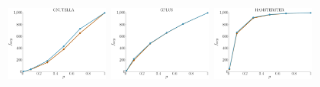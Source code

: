 \documentclass[a4paper]{report}
\newcommand{\wratio}{0.195}
\begin{document}
\includegraphics[width=\wratio\textwidth]{influence/GNUTELLA/fs_gnutella}\hfill
\vfill
\includegraphics[width=\wratio\textwidth]{influence/GPLUS/fs_gplus}\hfill
\includegraphics[width=\wratio\textwidth]{influence/HAMSTERSTER/fs_hamsterster}\hfill
\end{document}
